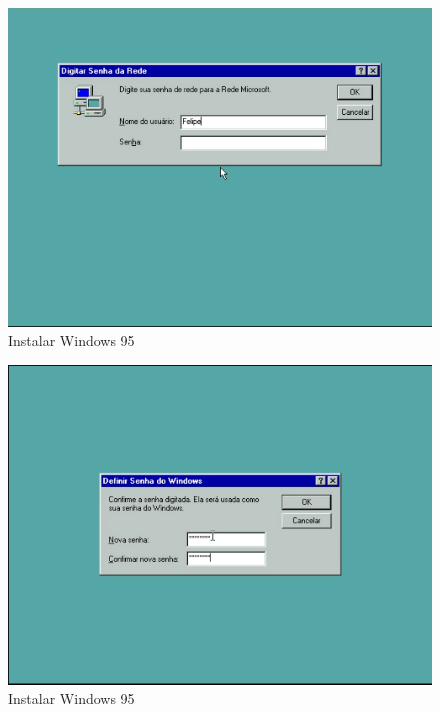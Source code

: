 \documentclass{report}
\begin{document}
\begin{figure}
\centering
\includegraphics[width=\textwidth]{Screenshot_52.png}
\caption{Instalar Windows 95}
\label{fig:52}
\end{figure}

\begin{figure}
\centering
\includegraphics[width=\textwidth]{Screenshot_53.png}
\caption{Instalar Windows 95}
\label{fig:53}
\end{figure}
\end{document}
